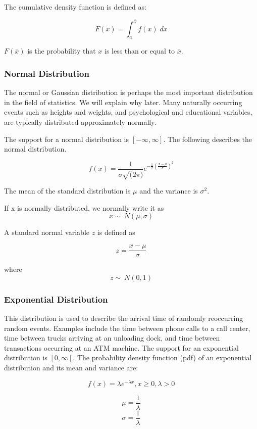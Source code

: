 \documentclass[
]{article}
\begin{document}
The cumulative density function is defined as:

\[F(\overline{x}) = \int_{a}^{\overline{x}} f(x) \; dx\]

\(F(\overline{x})\) is the probability that \(x\) is less than or equal
to \(\overline{x}\).

\hypertarget{normal-distribution}{%
\subsubsection{Normal Distribution}\label{normal-distribution}}

The normal or Gaussian distribution is perhaps the most important
distribution in the field of statistics. We will explain why later. Many
naturally occurring events such as heights and weights, and
psychological and educational variables, are typically distributed
approximately normally.

The support for a normal distribution is \([-\infty, \infty]\). The
following describes the normal distribution.

\[f(x) = \frac{1}{\sigma\sqrt(2\pi)} e^{-\frac{1}{2}(\frac{x-\mu}{\sigma})^2}\]

The mean of the standard distribution is \(\mu\) and the variance is
\(\sigma^2\).

If x is normally distributed, we normally write it as
\[x \sim ~N(\mu,\sigma)\]

A standard normal variable \(z\) is defined as

\[ z = \frac{x-\mu}{\sigma}\]

where \[z \sim ~N(0,1)\]

\hypertarget{exponential-distribution}{%
\subsubsection{Exponential
Distribution}\label{exponential-distribution}}

This distribution is used to describe the arrival time of randomly
reoccurring random events. Examples include the time between phone calls
to a call center, time between trucks arriving at an unloading dock, and
time between transactions occurring at an ATM machine. The support for
an exponential distribution is \([0,\infty]\). The probability density
function (pdf) of an exponential distribution and its mean and variance
are:

\[f(x) = \lambda e^{-\lambda x},  x\ge 0,  \lambda>0\]

\[\mu = \frac{1}{\lambda}\] \[\sigma = \frac{1}{\lambda}\]
\end{document}
